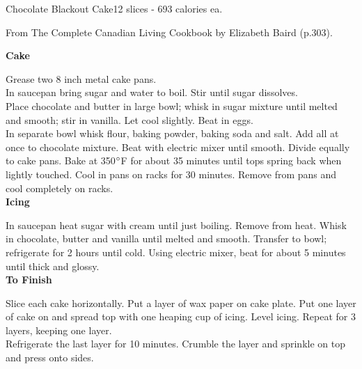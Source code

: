 \begin{recipe}{Chocolate Blackout Cake}{12 slices - 693 calories ea.}{}

\freeform From {\normalfont The Complete Canadian Living Cookbook} by Elizabeth Baird (p.303).


\textbf{Cake}

Grease two 8 inch metal cake pans.\\

In saucepan bring sugar and water to boil. Stir until sugar dissolves.\\

Place chocolate and butter in large bowl; whisk in sugar mixture until melted and smooth; stir in vanilla. Let cool slightly. Beat in eggs.\\

In separate bowl whisk flour, baking powder, baking soda and salt. Add all at once to chocolate mixture. Beat with electric mixer until smooth. Divide equally to cake pans. Bake at 350$\degree$F for about 35 minutes until tops spring back when lightly touched. Cool in pans on racks for 30 minutes. Remove from pans and cool completely on racks.\\

\textbf{Icing}

In saucepan heat sugar with cream until just boiling. Remove from heat. Whisk
in chocolate, butter and vanilla until melted and smooth. Transfer to bowl; refrigerate for 2 hours until cold. Using electric mixer, beat for about 5 minutes until thick and glossy.\\

\textbf{To Finish}

Slice each cake horizontally. Put a layer of wax paper on cake plate. Put one layer of cake on and spread top with one heaping cup of icing. Level icing. Repeat for 3 layers, keeping one layer.\\

Refrigerate the last layer for 10 minutes. Crumble the layer and sprinkle on top and press onto sides.

\end{recipe}
